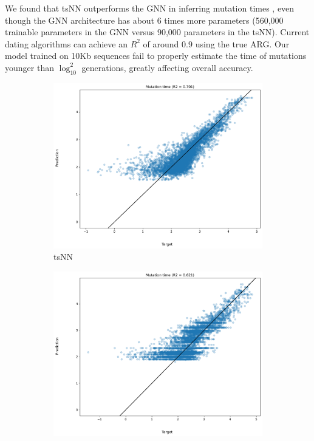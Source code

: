 We found that tsNN outperforms the GNN in inferring mutation times ,
even though the GNN architecture has about 6 times more parameters (560,000 trainable parameters in the GNN versus 90,000 parameters in the tsNN).
Current dating algorithms can achieve an $R^2$ of around $0.9$ \citep{wohns_unified_2022} using the true ARG.
Our model trained on 10Kb sequences fail to properly estimate the time of mutations younger than $\log_{10}^2$ generations,
greatly affecting overall accuracy.

\begin{figure}[htp]
\centering
\begin{subfigure}[b]{.51\linewidth}
    \includegraphics[width=\linewidth]{tsnn_figs/tsnn_ntrain_900_clen_10kb_mut-rate_2e-8_ssize_100_scatter_val_redone.pdf}
\caption{tsNN}\label{fig:10kb_tsnn}
\end{subfigure}
\hfill
\begin{subfigure}[b]{.51\linewidth}
\includegraphics[width=\linewidth]{tsnn_figs/gnn_ntrain_900_clen_10kb_mut-rate_2e-8_ssize_100_nnodefeat_16_scatter_val.pdf}

\end{subfigure}
\end{figure}
